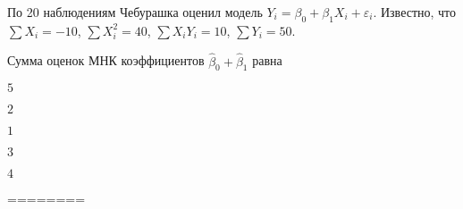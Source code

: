 
\begin{question}
По 20 наблюдениям Чебурашка оценил модель
\(Y_i = \beta_0 + \beta_1 X_i + \varepsilon_i\). Известно, что
\(\sum X_i = -10\), \(\sum X_i^2 = 40\), \(\sum X_i Y_i = 10\),
\(\sum Y_i = 50\).

Сумма оценок МНК коэффициентов \(\hat \beta_0 + \hat \beta_1\) равна
\begin{answerlist}
  \item \(5\)
  \item \(2\)
  \item \(1\)
  \item \(3\)
  \item \(4\)
\end{answerlist}
\end{question}

\begin{solution}
========
\end{solution}

